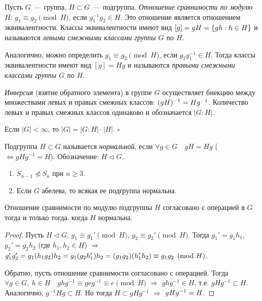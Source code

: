 \documentclass[a4paper]{article}
\newcommand*{\p}[1]{#1\nobreak\discretionary{}{\hbox{$\mathsurround=0pt #1$}}{}}
\begin{document}
Пусть $G$~--- группа, $H\subset G$~--- подгруппа. \emph{Отношение
сравнимости по модулю $H$}: $g_1\equiv g_2\pmod{H}$, если
$g_1^{-1}g_2\in H$. Это отношение является отношением
эквивалентности. Классы эквивалентности имеют вид $[g]\p=gH=\{gh:
h\in H\}$ и называются \emph{левыми смежными классами группы $G$ по
$H$}.

Аналогично, можно определить $g_1\equiv g_2\pmod{H}$, если
$g_2g_1^{-1}\in H$. Тогда классы эквивалентности имеют вид $[g]=Hg$
и называются \emph{правыми смежными классами группы $G$ по $H$}.

\emph{Инверсия} (взятие обратного элемента) в группе $G$
осуществляет биекцию между множествами левых и правых смежных
классов: $(gH)^{-1}\p=Hg^{-1}$. Количество левых и правых смежных
классов одинаково и обозначается $|G:H|$.

\begin{theorem}[Лагранж]
Если $|G|<\infty$, то $|G|=|G:H|\cdot |H|$. $\square$
\end{theorem}

Подгруппа $H\subset G$ называется \emph{нормальной}, если $\forall
g\in G\quad gH=Hg$ ($\Leftrightarrow gHg^{-1}=H$). Обозначение:
$H\triangleleft G$.

\begin{ex}
\begin{enumerate}
  \item $S_{n-1}\ntriangleleft S_n$ при $n\geqslant 3$.
  \item Если $G$ абелева, то всякая ее подгруппа нормальна.
\end{enumerate}
\end{ex}

\begin{theorem}
Отношение сравнимости по модулю подгруппы $H$ согласовано с
операцией в $G$ тогда и только тогда. когда $H$ нормальна.
\end{theorem}

\begin{proof}
Пусть $H\triangleleft G$, $g_1\equiv g_1'\pmod{H}$, $g_2\equiv
g_2'\pmod{H}$. Тогда $g_1'=g_1h_1$, $g_2'=g_2h_2$ (где $h_1,h_2\in
H$) $\Rightarrow$
$g_1'g_2'=g_1(h_1g_2)h_2=g_1(g_2h_1')h_2\p=(g_1g_2)(h_1'h_2)\equiv
g_1g_2\pmod{H}$.

Обратно, пусть отношение сравнимости согласовано с операцией. Тогда
$\forall g\in G,\: h\in H\quad ghg^{-1}\equiv geg^{-1}\equiv
e\pmod{H}$ $\Rightarrow$ $ghg^{-1}\in H$, т.е. $gHg^{-1}\subset H$.
Аналогично, $g^{-1}Hg\subset H$. Но тогда $H\subset gHg^{-1}$
$\Rightarrow$ $gHg^{-1}\p=H$.
\end{proof}
\end{document}
